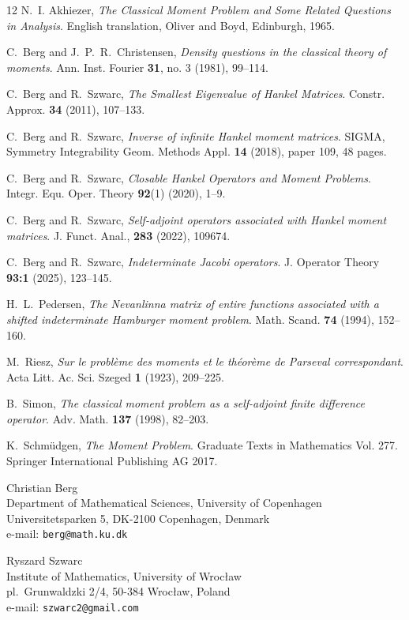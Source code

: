 \documentclass [12pt]{article}
\begin{document}
\begin{thebibliography}{12}
  N.~I. Akhiezer,  {\it The Classical Moment Problem and Some Related
 Questions in Analysis}. English translation, Oliver and Boyd, Edinburgh,
 1965.

 C.~Berg and J.~P.~R.~Christensen,  {\it Density questions in the classical theory of moments}.  Ann. Inst. Fourier  {\bf 31}, no. 3 (1981), 99--114.

 C.~Berg and R.~Szwarc,  {\it The Smallest Eigenvalue of Hankel Matrices}. Constr. Approx. {\bf 34} (2011), 107--133.

 C.~Berg and R.~Szwarc,  {\it Inverse of infinite Hankel moment matrices}. SIGMA, Symmetry Integrability Geom. Methods Appl. {\bf 14} (2018), paper 109, 48 pages.

 C.~Berg and R.~Szwarc,  {\it Closable Hankel Operators and Moment Problems}.
Integr. Equ. Oper. Theory {\bf 92}(1) (2020), 1--9.

 C.~Berg and R.~Szwarc, {\it Self-adjoint operators associated with Hankel moment matrices}. J. Funct. Anal., {\bf 283} (2022), 109674. 

 C.~Berg and R.~Szwarc, {\it Indeterminate Jacobi operators}. J. Operator Theory {\bf 93:1} (2025), 123--145.

 H.~L.~Pedersen, {\it The Nevanlinna matrix of entire functions associated with a shifted indeterminate Hamburger moment problem}. Math. Scand. {\bf 74} (1994), 152--160.

 M.~Riesz, {\it Sur le probl{\`e}me des moments et le th{\'e}or{\`e}me de Parseval correspondant}. Acta Litt. Ac. Sci. Szeged {\bf 1} (1923), 209--225.

 B.~Simon, {\it The classical moment problem as a self-adjoint finite difference operator}. Adv. Math. {\bf 137} (1998), 82--203.

 K.~Schm\"{u}dgen, {\it The Moment Problem}. Graduate Texts in Mathematics Vol. 277. Springer International Publishing AG 2017. 

\end{thebibliography}

\noindent
Christian Berg\\
Department of Mathematical Sciences, University of Copenhagen\\
Universitetsparken 5, DK-2100 Copenhagen, Denmark\\
e-mail: {\tt{berg@math.ku.dk}}

\vspace{0.4cm}
\noindent
Ryszard Szwarc\\
Institute of Mathematics, University of Wroc{\l}aw\\
pl.\ Grunwaldzki 2/4, 50-384 Wroc{\l}aw, Poland\\ 
e-mail: {\tt{szwarc2@gmail.com}}
\end{document}
